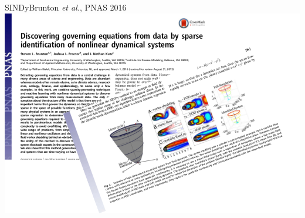 \documentclass[usenames,dvipsnames,svgnames,10pt,aspectratio=169]{beamer}
\begin{document}
\begin{frame}[t, c]{SINDy}{Brunton \emph{et al.}, PNAS 2016}
	\centering
	\includegraphics[width=.75\textwidth]{sindy_paper}
\end{frame}
\end{document}
